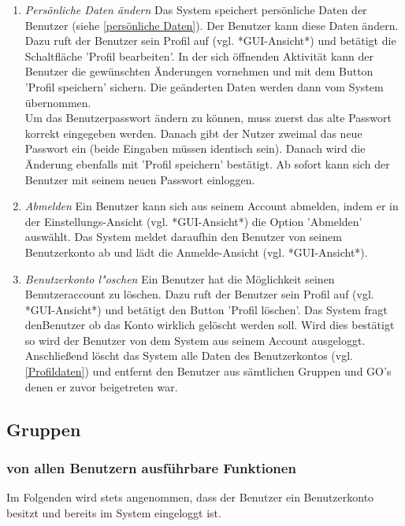 \documentclass[parskip=full]{scrartcl}
\def\threedigits#1{%
  \ifnum#1<100 0\fi
  \ifnum#1<10 0\fi
  \number#1}
\begin{document}
\begin{enumerate}[label={\textbf{/F\protect\threedigits{\theenumi}0/}}, leftmargin=*]
	\item \textit{Persönliche Daten ändern} Das System speichert persönliche Daten der Benutzer (siehe  \ref{persönliche Daten}). Der Benutzer kann diese Daten ändern. Dazu ruft der Benutzer sein Profil auf (vgl. *GUI-Ansicht*) und betätigt die Schaltfläche 'Profil bearbeiten'. In der sich öffnenden Aktivität kann der Benutzer die gewünschten Änderungen vornehmen und mit dem Button 'Profil speichern' sichern. Die geänderten Daten werden dann vom System übernommen.\\
	Um das Benutzerpasswort ändern zu können, muss zuerst das alte Passwort korrekt eingegeben werden. Danach gibt der Nutzer zweimal das neue Passwort ein (beide Eingaben müssen identisch sein). Danach wird die Änderung ebenfalls mit 'Profil speichern' bestätigt. Ab sofort kann sich der Benutzer mit seinem neuen Passwort einloggen.
	
	\item \textit{Abmelden} Ein Benutzer kann sich aus seinem Account abmelden, indem er in der Einstellungs-Ansicht (vgl. *GUI-Ansicht*) die Option 'Abmelden' auswählt. Das System meldet daraufhin den Benutzer von seinem Benutzerkonto ab und lädt die Anmelde-Ansicht (vgl. *GUI-Ansicht*).
	
	\item \textit{Benutzerkonto l"oschen}
	Ein Benutzer hat die Möglichkeit seinen Benutzeraccount zu löschen. Dazu ruft der Benutzer sein Profil auf (vgl. *GUI-Ansicht*) und betätigt den Button 'Profil löschen'. Das System fragt denBenutzer ob das Konto wirklich gelöscht werden soll. Wird dies bestätigt so wird der Benutzer von dem System aus seinem Account ausgeloggt. Anschließend löscht das System alle Daten des Benutzerkontos (vgl. \ref{Profildaten}) und entfernt den Benutzer aus sämtlichen Gruppen und GO's denen er zuvor beigetreten war.
\end{enumerate}

\subsection{Gruppen}

\subsubsection{von allen Benutzern ausführbare Funktionen} %
Im Folgenden wird stets angenommen, dass der Benutzer ein Benutzerkonto besitzt und bereits im System eingeloggt ist.
\end{document}

